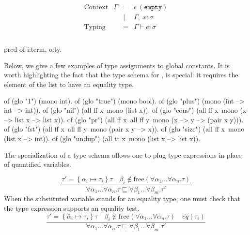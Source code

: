\documentclass[a4paper, 11pt]{book}
\begin{document}
\begin{center}
\begin{minipage}{0.5\textwidth}
$$
\begin{array}{llrl}
  \\
    \text{Context}     & \Gamma & = & \epsilon\ \mathtt{(empty)}\\
                       &        & \vert& \Gamma,\ x : \sigma\\
    \text{Typing}      &        & = & \Gamma \vdash e : \sigma\\
  \\
  \end{array}
$$
\end{minipage}
\begin{minipage}{0.4\textwidth}
\begin{elpicodelj}
pred of i:term, o:ty.
\end{elpicodelj}
\end{minipage}
\end{center}


Below, we give a few examples of type assignments to global constants. It is
worth highlighting the fact that the type schema for , is
special: it requires the element of the list to have an equality type.

\begin{elpicode}
of (glo "1")      (mono int).
of (glo "true")   (mono bool).
of (glo "plus")   (mono (int --> int --> int)).
of (glo "nil")    (all ff x\ mono (list x)).
of (glo "cons")   (all ff x\ mono (x --> list x --> list x)).
of (glo "pr")     (all ff x\ all ff y\ mono (x --> y --> (pair x y))).
of (glo "fst")    (all ff x\ all ff y\ mono (pair x y --> x)).
of (glo "size")   (all ff x\ mono (list x --> int)).
of (glo "undup")  (all tt x\ mono (list x --> list x)).
\end{elpicode}
\noindent
The specialization of a type schema allows one to plug type expressions in
place of quantified variables.

$$
\displaystyle\frac{\tau' = \left\{\alpha_i \mapsto \tau_i\right\} \tau \quad \beta_i \not\in \textrm{free}(\forall \alpha_1...\forall\alpha_n . \tau)}{\forall \alpha_1...\forall\alpha_n . \tau \sqsubseteq \forall \beta_1...\forall\beta_m . \tau'}
$$
 When the substituted variable stands for an
equality type, one must check that the type expression supports an equality
test.
$$
\displaystyle\frac{\tau' = \left\{\bar\alpha_i \mapsto \tau_i\right\} \tau \quad \beta_i \not\in \textrm{free}(\forall \alpha_1...\forall\alpha_n . \tau) \quad \overline{eq}(\tau_i)}{\forall \alpha_1...\forall\alpha_n . \tau \sqsubseteq \forall \beta_1...\forall\beta_m . \tau'}
$$
\end{document}
